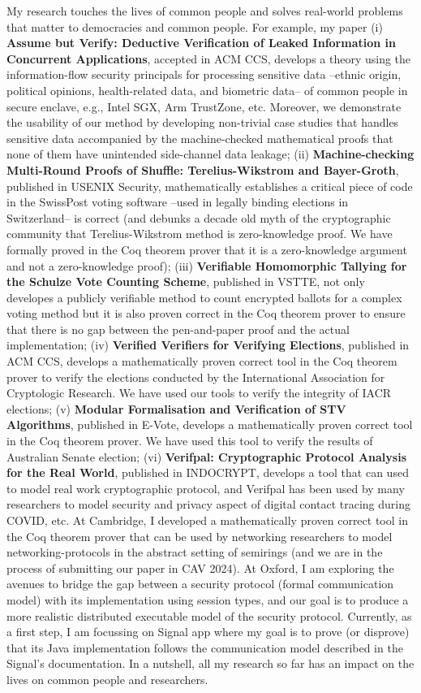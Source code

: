 \documentclass[11pt,a4paper,roman]{moderncv}
\begin{document}
My research touches the lives of common people and solves 
real-world problems that matter to democracies and common people. For example, my paper (i)
\textbf{Assume but Verify: Deductive Verification of Leaked Information in Concurrent Applications},
accepted in ACM CCS, develops a theory using the information-flow security principals 
for processing sensitive data --ethnic origin, political opinions,
health-related data, and  biometric data-- of common 
people in secure enclave, e.g., Intel SGX, Arm TrustZone, etc. Moreover, 
we demonstrate the usability of our method by developing non-trivial case studies that handles 
sensitive data accompanied by the machine-checked mathematical proofs that none of 
them have unintended side-channel data leakage; 
(ii) \textbf{Machine-checking Multi-Round Proofs of Shuffle: Terelius-Wikstrom and Bayer-Groth}, 
published in USENIX Security, mathematically establishes a critical piece of 
code in the SwissPost voting software --used in legally binding 
elections in Switzerland-- is correct (and debunks a decade old myth of the cryptographic 
community that Terelius-Wikstrom method is zero-knowledge proof. We have formally 
proved in the Coq theorem prover that it is a zero-knowledge argument and not 
a zero-knowledge proof);
(iii) \textbf{Verifiable Homomorphic Tallying for the Schulze Vote Counting Scheme}, published 
in VSTTE, not only developes a publicly verifiable method to count encrypted ballots for 
a complex voting method but it 
is also proven correct in the Coq theorem prover to ensure that there is no gap between 
the pen-and-paper proof and the actual implementation;  (iv) \textbf{Verified Verifiers for 
Verifying Elections}, published in ACM CCS, develops a mathematically proven correct tool 
in the Coq theorem prover to verify the elections conducted by 
the International Association for Cryptologic Research. We have used 
our tools to verify the integrity of IACR elections; (v) \textbf{Modular Formalisation and 
Verification of STV Algorithms}, published in E-Vote, develops a mathematically proven 
correct tool in the Coq theorem prover. We have used this tool to verify
the results of Australian Senate election; 
(vi) \textbf{Verifpal: Cryptographic Protocol Analysis for the Real World}, published in 
INDOCRYPT, develops a tool that can used to model real work cryptographic protocol, and 
Verifpal has been used by many researchers to model security and privacy aspect of 
digital contact tracing during COVID, etc.
At Cambridge, I developed a mathematically proven correct tool in the Coq theorem prover 
that can be used by networking researchers to model networking-protocols in the abstract 
setting of semirings (and we are in the process of submitting our paper in CAV 2024).
At Oxford, I am exploring the avenues to bridge the gap between a security protocol 
(formal communication model) with its implementation using session types, and our 
goal is to produce a more realistic distributed executable model of the security protocol. 
Currently, as a first step, I am focussing on Signal app 
where my goal is to prove (or disprove) that its Java implementation follows the 
communication model described in the Signal's documentation. 
In a nutshell, all my research so far has an impact on the lives on common people and 
researchers. 
\end{document}
